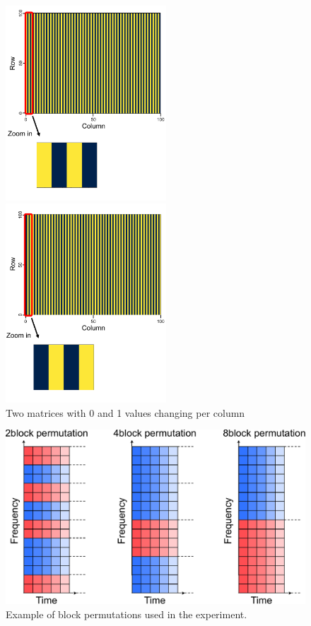 \begin{figure}[htbp]
    \begin{minipage}[b]{0.45\linewidth}
      \centering
      \includegraphics[keepaspectratio, width=6.0cm]{figures/origi_spec/stripe1.pdf}
    \end{minipage}
    \begin{minipage}[b]{0.45\linewidth}
      \centering
      \includegraphics[keepaspectratio, width=6.0cm]{figures/origi_spec/stripe2.pdf}
    \end{minipage}
    \caption{Two matrices with 0 and 1 values changing per column}
    \label{fig:stripe_spec}
\end{figure}

\begin{figure}[t]
    \begin{center}
        \includegraphics[width=1.0\columnwidth]{figures/experiment_block_matrix.pdf}
    \end{center}
	\caption{Example of block permutations used in the experiment.}
	\label{fig:ex_block}
\end{figure}

